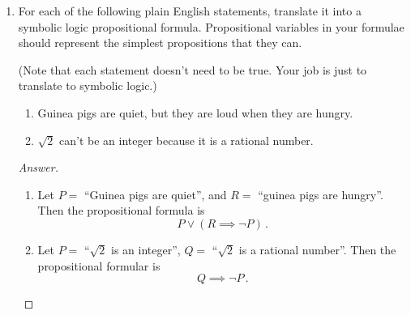 \documentclass[12pt]{amsart}
\begin{document}
\begin{enumerate}[label=\arabic*.,itemsep=10pt, leftmargin=*]
\begin{proof}[One possible answer]
    \end{proof}

\item  For each of the following plain English statements, translate
    it into a symbolic logic propositional formula.
    Propositional variables in your formulae should represent
    the simplest propositions that they can.

    (Note that each statement doesn't need to be true. Your job is 
    just to translate to symbolic logic.)

    \begin{enumerate}[label=\alph*.,itemsep=5pt, leftmargin=*]
    \item Guinea pigs are quiet, but they are loud when they are hungry.
    \item $\sqrt{2}$ can't be an integer because it is a rational number.
    \end{enumerate}
    \begin{proof}[Answer]
       \begin{enumerate}
           \item Let $P = $ ``Guinea pigs are quiet'', 
               and $R =$ ``guinea pigs are hungry''.
               Then the propositional formula is
               \begin{equation*}
                   P \vee (R \implies \neg P) \,.
               \end{equation*}
            
            \item Let $P = $ ``$\sqrt{2}$ is an integer'', 
                $Q = $ ``$\sqrt{2}$ is a rational number''.
                Then the propositional formular is 
                \begin{equation*}
                    Q \implies \neg P \,.
                \end{equation*}
       \end{enumerate} 
    \end{proof}



\end{enumerate}
\end{document}
